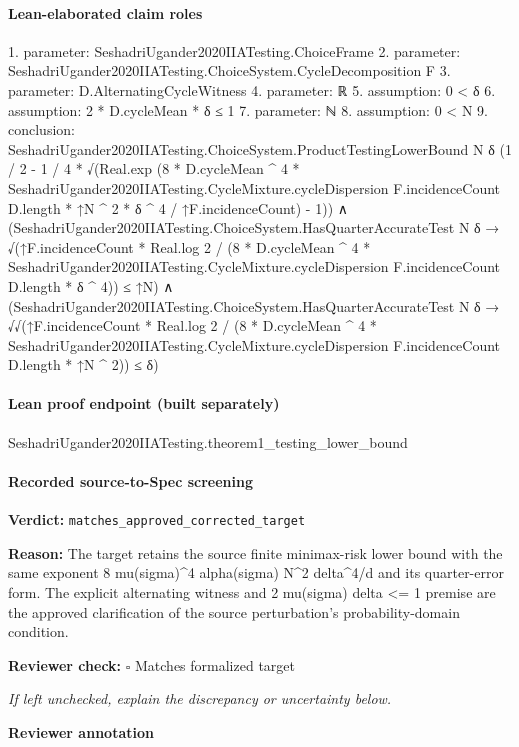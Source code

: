 \documentclass[10pt]{article}
\newcommand{\reviewerbox}{%
  \par\noindent\fbox{\parbox{0.96\linewidth}{\rule{0pt}{0.38in}}}\par
}
\newcommand{\reviewmatch}[1]{%
  \par\noindent\textbf{Reviewer check:} $\square$\; #1\par
  \noindent\emph{If left unchecked, explain the discrepancy or uncertainty below.}\par
}
\begin{document}
\paragraph{Lean-elaborated claim roles}\begin{ReviewVerbatim}
1. parameter: SeshadriUgander2020IIATesting.ChoiceFrame
2. parameter: SeshadriUgander2020IIATesting.ChoiceSystem.CycleDecomposition F
3. parameter: D.AlternatingCycleWitness
4. parameter: ℝ
5. assumption: 0 < δ
6. assumption: 2 * D.cycleMean * δ ≤ 1
7. parameter: ℕ
8. assumption: 0 < N
9. conclusion: SeshadriUgander2020IIATesting.ChoiceSystem.ProductTestingLowerBound N δ
    (1 / 2 -
      1 / 4 *
        √(Real.exp
              (8 * D.cycleMean ^ 4 *
                      SeshadriUgander2020IIATesting.CycleMixture.cycleDispersion F.incidenceCount D.length *
                    ↑N ^ 2 *
                  δ ^ 4 /
                ↑F.incidenceCount) -
            1)) ∧
  (SeshadriUgander2020IIATesting.ChoiceSystem.HasQuarterAccurateTest N δ →
      √(↑F.incidenceCount * Real.log 2 /
            (8 * D.cycleMean ^ 4 *
                SeshadriUgander2020IIATesting.CycleMixture.cycleDispersion F.incidenceCount D.length *
              δ ^ 4)) ≤
        ↑N) ∧
    (SeshadriUgander2020IIATesting.ChoiceSystem.HasQuarterAccurateTest N δ →
      √√(↑F.incidenceCount * Real.log 2 /
              (8 * D.cycleMean ^ 4 *
                  SeshadriUgander2020IIATesting.CycleMixture.cycleDispersion F.incidenceCount D.length *
                ↑N ^ 2)) ≤
        δ)
\end{ReviewVerbatim}

\paragraph{Lean proof endpoint (built separately)}\begin{ReviewVerbatim}
SeshadriUgander2020IIATesting.theorem1_testing_lower_bound
\end{ReviewVerbatim}

\paragraph{Recorded source-to-Spec screening}
\textbf{Verdict:} \texttt{matches\_approved\_corrected\_target}
\\
{\raggedright
\textbf{Reason:} The target retains the source finite minimax-\allowbreak{}risk lower bound with the same exponent 8 mu(sigma)\textasciicircum{}4 alpha(sigma) N\textasciicircum{}2 delta\textasciicircum{}4/\allowbreak{}d and its quarter-\allowbreak{}error form.\allowbreak{} The explicit alternating witness and 2 mu(sigma) delta <= 1 premise are the approved clarification of the source perturbation's probability-\allowbreak{}domain condition.\allowbreak{}
\par}
\reviewmatch{Matches formalized target}
\noindent\textbf{Reviewer annotation}\par
\reviewerbox
\clearpage
\hypertarget{source-claim-cfe27cf1054f4fbd}{}
\end{document}
